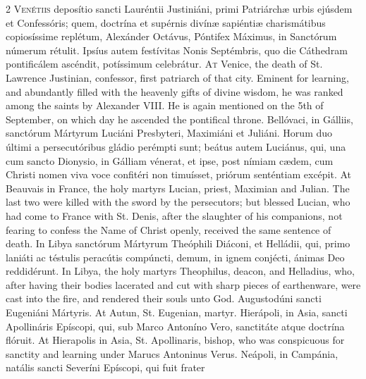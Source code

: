 \begin{paracol}{2}
\lettrine[lines=2]{V}{enétiis} deposítio sancti Lauréntii Justiniáni, primi Patriárchæ 
 urbis ejúsdem et Confessóris; quem, doctrína et supérnis divínæ sapiéntiæ 
 charismátibus copiosíssime replétum, Alexánder Octávus, Póntifex Máximus, in 
 Sanctórum númerum rétulit. Ipsíus autem festívitas Nonis Septémbris, 
 quo die Cáthedram pontificálem ascéndit, potíssimum celebrátur.
\switchcolumn
{}
\lettrine[lines=2]{A}{t} Venice, the death of St. Lawrence Justinian, confessor, first patriarch 
 of that city. Eminent for learning, and abundantly filled with the 
 heavenly gifts of divine wisdom, he was ranked among the saints by Alexander 
 VIII. He is again mentioned on the 5th of September, on which day he 
 ascended the pontifical throne.
\switchcolumn*
{}
Bellóvaci, in Gálliis, sanctórum Mártyrum 
 Luciáni Presbyteri, Maximiáni et Juliáni. Horum duo últimi a persecutóribus 
 gládio perémpti sunt; beátus autem Luciánus, qui, una cum sancto Dionysio, 
 in Gálliam vénerat, et ipse, post nímiam cædem, cum Christi nomen viva voce 
 confitéri non timuísset, priórum senténtiam excépit.
\switchcolumn
{}
At Beauvais in France, the holy martyrs Lucian, priest, Maximian and Julian. 
 The last two were killed with the sword by the persecutors; but blessed 
 Lucian, who had come to France with St. Denis, after the slaughter of his 
 companions, not fearing to confess the Name of Christ openly, received the 
 same sentence of death.
\switchcolumn*
{}
In Libya sanctórum Mártyrum Theóphili Diáconi, et Helládii, qui, primo 
 laniáti ac téstulis peracútis compúncti, demum, in ignem conjécti, ánimas 
 Deo reddidérunt.
\switchcolumn
{}
In Libya, the holy martyrs Theophilus, deacon, and Helladius, who, after 
 having their bodies lacerated and cut with sharp pieces of earthenware, were 
 cast into the fire, and rendered their souls unto God.
\switchcolumn*
{}
Augustodúni sancti Eugeniáni Mártyris.
\switchcolumn
{}
At Autun, St. Eugenian, martyr.
\switchcolumn*
{}
Hierápoli, in Asia, sancti Apollináris Epíscopi, qui, sub Marco Antoníno 
 Vero, sanctitáte atque doctrína flóruit.
\switchcolumn
{}
At Hierapolis in Asia, St. Apollinaris, bishop, who was conspicuous for 
 sanctity and learning under Marucs Antoninus Verus.
\switchcolumn*
{}
Neápoli, in Campánia, natális sancti Severíni Epíscopi, qui fuit frater 

\end{paracol}
